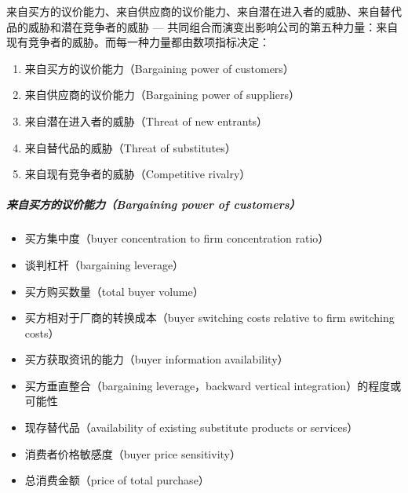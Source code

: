 \documentclass[letterpaper,11pt,english]{sphinxmanual}
\begin{document}
来自买方的议价能力、来自供应商的议价能力、来自潜在进入者的威胁、来自替代品的威胁和潜在竞争者的威胁
—
共同组合而演变出影响公司的第五种力量：来自现有竞争者的威胁。而每一种力量都由数项指标决定：
\begin{enumerate}
%
\item {} 
来自买方的议价能力（Bargaining power of customers）

\item {} 
来自供应商的议价能力（Bargaining power of suppliers）

\item {} 
来自潜在进入者的威胁（Threat of new entrants）

\item {} 
来自替代品的威胁（Threat of substitutes）

\item {} 
来自现有竞争者的威胁（Competitive rivalry）

\end{enumerate}


\subparagraph{来自买方的议价能力（Bargaining power of customers）}
\label{\detokenize{chapter_skill/BRD:bargaining-power-of-customers}}\begin{itemize}
\item {} 
买方集中度（buyer concentration to firm concentration ratio）

\item {} 
谈判杠杆（bargaining leverage）

\item {} 
买方购买数量（total buyer volume）

\item {} 
买方相对于厂商的转换成本（buyer switching costs relative to firm
switching costs）

\item {} 
买方获取资讯的能力（buyer information availability）

\item {} 
买方垂直整合（bargaining leverage，backward vertical
integration）的程度或可能性

\item {} 
现存替代品（availability of existing substitute products or
services）

\item {} 
消费者价格敏感度（buyer price sensitivity）

\item {} 
总消费金额（price of total purchase）

\end{itemize}
\end{document}
